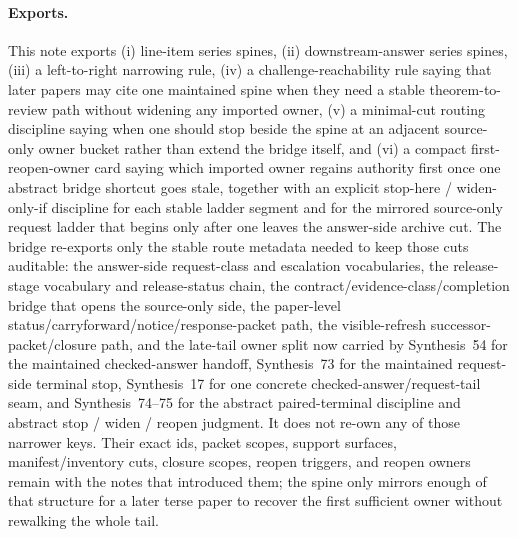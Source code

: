 \documentclass[11pt]{article}
\begin{document}
\paragraph{Exports.}
This note exports (i) line-item series spines, (ii) downstream-answer series spines, (iii) a left-to-right narrowing rule, (iv) a challenge-reachability rule saying that later papers may cite one maintained spine when they need a stable theorem-to-review path without widening any imported owner, (v) a minimal-cut routing discipline saying when one should stop beside the spine at an adjacent source-only owner bucket rather than extend the bridge itself, and (vi) a compact first-reopen-owner card saying which imported owner regains authority first once one abstract bridge shortcut goes stale, together with an explicit stop-here / widen-only-if discipline for each stable ladder segment and for the mirrored source-only request ladder that begins only after one leaves the answer-side archive cut.
The bridge re-exports only the stable route metadata needed to keep those cuts auditable: the answer-side request-class and escalation vocabularies, the release-stage vocabulary and release-status chain, the contract/evidence-class/completion bridge that opens the source-only side, the paper-level status/carryforward/notice/response-packet path, the visible-refresh successor-packet/closure path, and the late-tail owner split now carried by Synthesis~54 for the maintained checked-answer handoff, Synthesis~73 for the maintained request-side terminal stop, Synthesis~17 for one concrete checked-answer/request-tail seam, and Synthesis~74--75 for the abstract paired-terminal discipline and abstract stop / widen / reopen judgment.
It does not re-own any of those narrower keys.
Their exact ids, packet scopes, support surfaces, manifest/inventory cuts, closure scopes, reopen triggers, and reopen owners remain with the notes that introduced them; the spine only mirrors enough of that structure for a later terse paper to recover the first sufficient owner without rewalking the whole tail.\cite{series:challengeanswerreviewmenus,series:publicrequestcontracts,series:requestableevidenceclasses,series:requestfulfillmentcertificates,series:publicrequeststatusenvelopes,series:publicrequestcarryforward,series:publicrequestnotices,series:publicrequestnoticenormalforms,series:publicrequestnoticeselections,series:publicrequestresponsemenus,series:publicrequestresponsepackets,series:publicrequestresponsepacketcarryforward,series:publicrequestresponsepacketdeltas,series:publicrequestresponsepacketrefreshnotices,series:publicrequestresponsepacketrefreshnoticenormalforms,series:publicrequestresponsepacketrefreshnoticeselections,series:publicrequestresponsepacketrefreshresponsemenus,series:publicrequestresponsepacketrefreshresponsepackets,series:publicrequestresponsepacketrefreshresponsepacketclosureverdicts,series:pairedterminalcitationdiscipline,series:pairedterminalcutoverrules}
\end{document}
